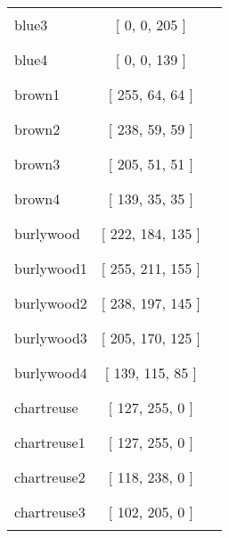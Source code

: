 \begin{tabular}{|l|c|c|}
blue3 & [ 0, 0, 205 ] & \color{blue3} \rule{1cm}{1.5ex}\\
blue4 & [ 0, 0, 139 ] & \color{blue4} \rule{1cm}{1.5ex}\\
brown1 & [ 255, 64, 64 ] & \color{brown1} \rule{1cm}{1.5ex}\\
brown2 & [ 238, 59, 59 ] & \color{brown2} \rule{1cm}{1.5ex}\\
brown3 & [ 205, 51, 51 ] & \color{brown3} \rule{1cm}{1.5ex}\\
brown4 & [ 139, 35, 35 ] & \color{brown4} \rule{1cm}{1.5ex}\\
burlywood & [ 222, 184, 135 ] & \color{burlywood} \rule{1cm}{1.5ex}\\
burlywood1 & [ 255, 211, 155 ] & \color{burlywood1} \rule{1cm}{1.5ex}\\
burlywood2 & [ 238, 197, 145 ] & \color{burlywood2} \rule{1cm}{1.5ex}\\
burlywood3 & [ 205, 170, 125 ] & \color{burlywood3} \rule{1cm}{1.5ex}\\
burlywood4 & [ 139, 115, 85 ] & \color{burlywood4} \rule{1cm}{1.5ex}\\
chartreuse & [ 127, 255, 0 ] & \color{chartreuse} \rule{1cm}{1.5ex}\\
chartreuse1 & [ 127, 255, 0 ] & \color{chartreuse1} \rule{1cm}{1.5ex}\\
chartreuse2 & [ 118, 238, 0 ] & \color{chartreuse2} \rule{1cm}{1.5ex}\\
chartreuse3 & [ 102, 205, 0 ] & \color{chartreuse3} \rule{1cm}{1.5ex}\\
\end{tabular}


